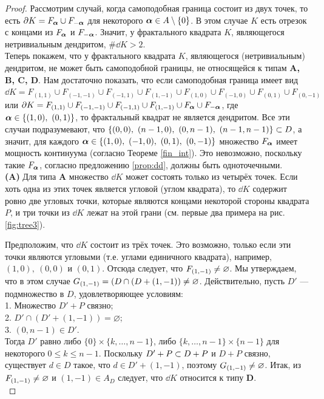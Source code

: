 \begin{proof}
Рассмотрим случай, когда самоподобная граница состоит из двух точек, то есть $\partial K=F_{\bm{\alpha}}\cup F_{-{\bm{\alpha}}}$ для некоторого ${\bm{\alpha}}\in A\setminus\{0\}$.
В этом случае $K$  есть отрезок с концами из $F_{\bm{\alpha}}$ и $ F_{-{\bm{\alpha}}}$.
Значит, у фрактального квадрата $K$, являющегося нетривиальным дендритом, $\#\dd K>2$.\\

Теперь покажем, что у фрактального квадрата $K$, являющегося (нетривиальным) дендритом, не может быть самоподобной границы, не относящейся к типам {\bf A, B, C, D}.
Нам достаточно показать, что если самоподобная граница имеет вид $\dd K=F_{(1,1)}\cup F_{(-1,-1)}\cup F_{(-1,1)}\cup F_{(1,-1)}\cup F_{(1,0)}\cup F_{(-1,0)}\cup F_{(0,1)}\cup F_{(0,-1)}$ или $\partial K=F_{(1,1)}\cup F_{(-1,-1)}\cup F_{(-1,1)}\cup F_{(1,-1)}\cup F_{\bm{\alpha}}\cup F_{-{\bm{\alpha}}}$, где ${\bm{\alpha}}\in\{(1,0),\ (0,1)\}$, то фрактальный квадрат не является дендритом.
Все эти случаи подразумевают, что $\{(0,0),\ (n-1,0),\ (0,n-1),\ (n-1,n-1)\}\subset D$, а значит, для каждого ${\bm{\alpha}}\in\{(1,0),\ (-1,0),\ (0,1),\ (0,-1)\}$ множество $F_{\bm{\alpha}}$ имеет мощность континуума (согласно Теореме \ref{fin_int}).
Это невозможно, поскольку такие $F_{\bm{\alpha}}$, согласно предложению \ref{prop:dd}, должны быть одноточечными.\\

{\bf (A)} Для типа {\bf A} множество $\dd K$ может состоять только из четырёх точек. 
Если хоть одна из этих точек является угловой (углом квадрата), то $\dd K$ содержит ровно две угловых точки, которые являются концами некоторой стороны квадрата $P$, и три точки из $\dd K$ лежат на этой грани (см. первые два примера на рис. \ref{fig:tree3}).

Предположим, что $\dd K$ состоит из трёх точек.
Это возможно, только если эти точки являются угловыми (т.е. углами единичного квадрата), например, $(1,0),\ (0,0)$ и $(0,1)$.
Отсюда следует, что $F_{(1,-1)}\neq\varnothing$.
Мы утверждаем, что в этом случае $G_{(1,-1)}=(D\cap (D+(1,-1))\neq\varnothing$.
Действительно, пусть $D'$ --- подмножество в $D$, удовлетворяющее условиям:\\
1. Множество $D'+P$ связно;\\
2. $D'\cap (D'+(1,-1))=\varnothing$;\\
3. $(0,n-1)\in D'$. \\
Тогда $D'$ равно либо $\{0\}\times\{k,\ldots,n-1\}$, либо $\{k,\ldots,n-1\}\times\{n-1\}$ для некоторого $0\leq k\leq n-1$.
Поскольку $D'+P\subset D+P$ и $D+P$ связно, существует $d\in D$ такое, что $d\in D'+(1,-1)$, поэтому $G_{(1,-1)}\neq\varnothing$.
Итак, из $F_{(1,-1)}\neq\varnothing$ и $(1,-1)\in A_D$ следует, что $\dd K$ относится к типу {\bf D}. \\


\end{proof}
